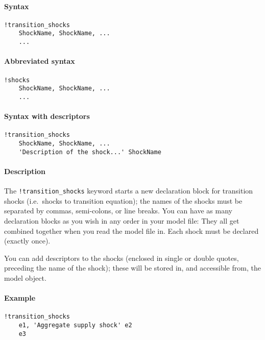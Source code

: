 


	\paragraph{Syntax}\label{syntax}

\begin{verbatim}
!transition_shocks
    ShockName, ShockName, ...
    ...
\end{verbatim}

\paragraph{Abbreviated syntax}\label{abbreviated-syntax}

\begin{verbatim}
!shocks
    ShockName, ShockName, ...
    ...
\end{verbatim}

\paragraph{Syntax with descriptors}\label{syntax-with-descriptors}

\begin{verbatim}
!transition_shocks
    ShockName, ShockName, ...
    'Description of the shock...' ShockName
\end{verbatim}

\paragraph{Description}\label{description}

The \texttt{!transition\_shocks} keyword starts a new declaration block
for transition shocks (i.e.~shocks to transition equation); the names of
the shocks must be separated by commas, semi-colons, or line breaks. You
can have as many declaration blocks as you wish in any order in your
model file: They all get combined together when you read the model file
in. Each shock must be declared (exactly once).

You can add descriptors to the shocks (enclosed in single or double
quotes, preceding the name of the shock); these will be stored in, and
accessible from, the model object.

\paragraph{Example}\label{example}

\begin{verbatim}
!transition_shocks
    e1, 'Aggregate supply shock' e2
    e3
\end{verbatim}



